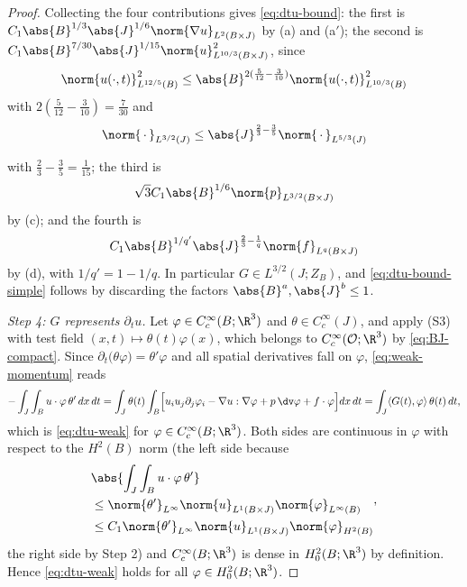 \documentclass[11pt,reqno]{amsart}
\begin{document}
\begin{proof}
Collecting the four contributions gives \eqref{eq:dtu-bound}: the first is
$C_{1}\abs{B}^{1/3}\abs{J}^{1/6}\norm{\nabla u}_{L^{2}(B\times J)}$ by (a) and
(a$'$); the second is
$C_{1}\abs{B}^{7/30}\abs{J}^{1/15}\norm{u}^{2}_{L^{10/3}(B\times J)}$, since
\[
\norm{u(\cdot,t)}^{2}_{L^{12/5}(B)}\le\abs{B}^{2(\frac5{12}-\frac3{10})}
 \norm{u(\cdot,t)}^{2}_{L^{10/3}(B)}
\]
 with $2(\tfrac5{12}-\tfrac3{10})=\tfrac7{30}$
and
\[
\norm{\,\cdot\,}_{L^{3/2}(J)}\le\abs{J}^{\frac23-\frac35}\norm{\,\cdot\,}_{L^{5/3}(J)}
\]

with $\tfrac23-\tfrac35=\tfrac1{15}$; the third is
\[
\sqrt{3}C_{1}\abs{B}^{1/6}\norm{p}_{L^{3/2}(B\times J)}
\]
 by (c); and the fourth is
\[
C_{1}\abs{B}^{1/q'}\abs{J}^{\frac23-\frac1q}\norm{f}_{L^{q}(B\times J)}
\]
 by (d),
with $1/q'=1-1/q$. In particular $G\in L^{3/2}(J;Z_{B})$, and
\eqref{eq:dtu-bound-simple} follows by discarding the factors
$\abs{B}^{a},\abs{J}^{b}\le1$.

\emph{Step 4: $G$ represents $\partial_{t}u$.} Let
$\varphi\in C_{c}^{\infty}(B;\R^{3})$ and $\theta\in C_{c}^{\infty}(J)$, and
apply (S3) with test field $(x,t)\mapsto\theta(t)\varphi(x)$, which belongs to
$C^{\infty}_{c}(\mathcal{O};\R^{3})$ by \eqref{eq:BJ-compact}. Since
$\partial_{t}\bigl(\theta\varphi\bigr)=\theta'\varphi$ and all spatial
derivatives fall on $\varphi$, \eqref{eq:weak-momentum} reads
\[
  -\int_{J}\int_{B}u\cdot\varphi\,\theta'\,dx\,dt
  =\int_{J}\theta(t)\int_{B}\Bigl[u_{i}u_{j}\partial_{j}\varphi_{i}
     -\nabla u:\nabla\varphi+p\,\dv\varphi+f\cdot\varphi\Bigr]dx\,dt
  =\int_{J}\langle G(t),\varphi\rangle\,\theta(t)\,dt ,
\]
which is \eqref{eq:dtu-weak} for $\varphi\in C_{c}^{\infty}(B;\R^{3})$. Both
sides are continuous in $\varphi$ with respect to the $H^{2}(B)$ norm (the
left side because
\[
\begin{aligned}
&\abs{\int_{J}\int_{B}u\cdot\varphi\,\theta'}
\\ &\le\norm{\theta'}_{L^{\infty}}\norm{u}_{L^{1}(B\times J)}\norm{\varphi}_{L^{\infty}(B)}
\\ &\le C_{1}\norm{\theta'}_{L^{\infty}}\norm{u}_{L^{1}(B\times J)}\norm{\varphi}_{H^{2}(B)}
\end{aligned}
,
\]
the right side by Step 2) and $C_{c}^{\infty}(B;\R^{3})$ is dense in
$H^{2}_{0}(B;\R^{3})$ by definition. Hence \eqref{eq:dtu-weak} holds for all
$\varphi\in H^{2}_{0}(B;\R^{3})$.
\end{proof}
\end{document}
